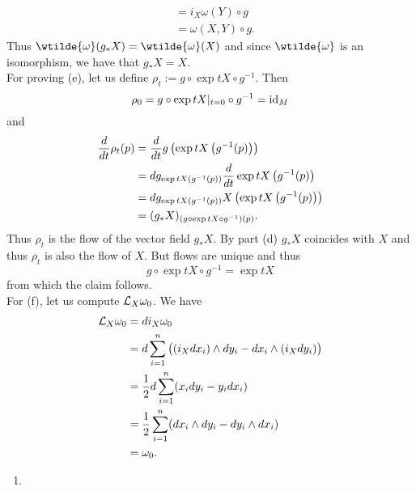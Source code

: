 \begin{solution}
\begin{align*}
		&= i_X\omega(Y) \circ g\\
		&= \omega(X,Y) \circ g.
	\end{align*}
	Thus $\wtilde{\omega}(g_*X) = \wtilde{\omega}(X)$ and since $\wtilde{\omega}$ is an isomorphism, we have that $g_*X = X$.\\
	For proving (e), let us define $\rho_t := g \circ \exp tX \circ g^{-1}$. Then 
	\begin{equation*}
		\rho_0 = g \circ \exp tX \vert_{t = 0} \circ g^{-1} = \operatorname{id}_M
	\end{equation*}
	\noindent and
	\begin{align*}
		\frac{d}{dt} \rho_t(p) &= \frac{d}{dt}g\del[1]{\exp tX\del[1]{g^{-1}(p)}}\\
		&= dg_{\exp tX\del[0]{g^{-1}(p)}}\frac{d}{dt}\exp tX\del[1]{g^{-1}(p)}\\
		&= dg_{\exp tX\del[0]{g^{-1}(p)}}X\del[1]{\exp tX\del[1]{g^{-1}(p)}}\\
		&= (g_*X)_{(g \circ \exp tX \circ g^{-1})(p)}.
	\end{align*}
	Thus $\rho_t$ is the flow of the vector field $g_* X$. By part (d) $g_* X$ coincides with $X$ and thus $\rho_t$ is also the flow of $X$. But flows are unique and thus 
	\begin{equation*}
		g \circ \exp tX \circ g^{-1} = \exp tX
	\end{equation*}
	\noindent from which the claim follows.\\
	For (f), let us compute $\mathcal{L}_X \omega_0$. We have
	\begin{align*}
		\Lcal_X\omega_0 &= di_X\omega_0\\
		&= d \sum_{i = 1}^n \del[1]{(i_X dx_i) \wedge dy_i - dx_i \wedge (i_Xdy_i)}\\
		&= \frac{1}{2}d \sum_{i = 1}^n (x_i dy_i - y_idx_i)\\
		&= \frac{1}{2}\sum_{i = 1}^n (dx_i \wedge dy_i - dy_i \wedge dx_i)\\
		&= \omega_0.
	\end{align*}
\end{solution}

\begin{exercise} 
\begin{enumerate}[label = \textup{(}\alph*\textup{)}]
\item  
\end{enumerate}
\end{exercise}

